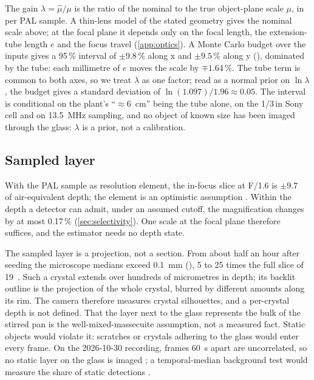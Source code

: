 The gain $\lambda = \hat\mu / \mu$ is the ratio of the nominal to the true object-plane scale $\mu$, in \um{} per
PAL sample. A thin-lens model of the stated geometry gives the nominal scale above; at the focal plane it depends
only on the focal length, the extension-tube length $e$ and the focus travel (\ref{app:optics}). A Monte Carlo budget
over the inputs gives a 95\,\% interval of $\pm 9.8$\,\% along x and $\pm 9.5$\,\% along y (),
dominated by the tube: each millimetre of $e$ moves the scale by $\mp 1.64$\,\%. The tube term is common to both
axes, so we treat $\lambda$ as one factor; read as a normal prior on $\ln\lambda$, the budget gives a standard
deviation of $\ln(1.097)/1.96 \approx 0.05$. The interval is conditional on the plant's ``$\approx 6$~cm'' being the
tube alone, on the 1/3\,in Sony cell and on 13.5~MHz sampling, and no object of known size has been imaged through
the glass: $\lambda$ is a prior, not a calibration.

\subsection{Sampled layer}\label{sec:layer}

With the PAL sample as resolution element, the in-focus slice at F/1.6 is $\pm 9.7$~\um{} of
air-equivalent depth; the element is an optimistic assumption . Within the depth a detector can admit, under an assumed cutoff, the magnification changes by at most
0.17\,\% (\ref{sec:selectivity}). One scale at the focal plane therefore suffices, and the estimator needs no depth
state.

The sampled layer is a projection, not a section. From about half an hour after seeding the microscope medians exceed
0.1~mm (), 5 to 25 times the full slice of 19~\um. Such a crystal extends over hundreds of
micrometres in depth; its backlit outline is the projection of the whole crystal, blurred by different amounts along
its rim. The camera therefore measures crystal silhouettes, and a per-crystal depth is not defined. That the layer
next to the glass represents the bulk of the stirred pan is the well-mixed-massecuite assumption, not a measured
fact. Static objects would violate it: scratches or crystals adhering to the glass would enter every frame. On the
2026-10-30 recording, frames 60~s apart are uncorrelated, so no static layer on the glass is imaged
; a temporal-median background test would measure the share of
static detections .

